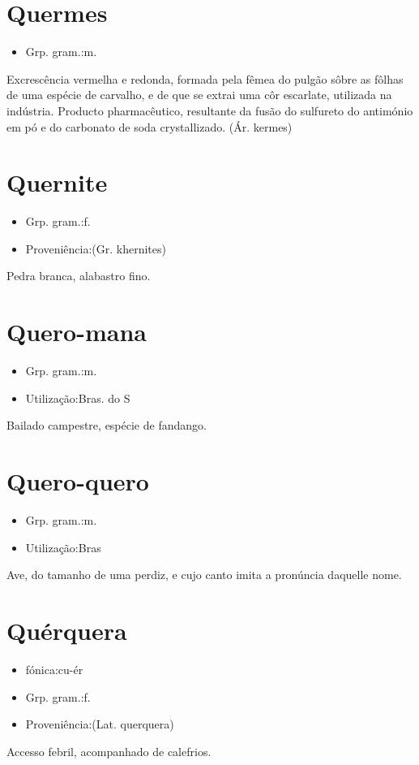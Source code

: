 \section{Quermes}
\begin{itemize}
\item {Grp. gram.:m.}
\end{itemize}
Excrescência vermelha e redonda, formada pela fêmea do pulgão sôbre as fôlhas de uma espécie de carvalho, e de que se extrai uma côr escarlate, utilizada na indústria.
Producto pharmacêutico, resultante da fusão do sulfureto do antimónio em pó e do carbonato de soda crystallizado.
(Ár. \textunderscore kermes\textunderscore )
\section{Quernite}
\begin{itemize}
\item {Grp. gram.:f.}
\end{itemize}
\begin{itemize}
\item {Proveniência:(Gr. \textunderscore khernites\textunderscore )}
\end{itemize}
Pedra branca, alabastro fino.
\section{Quero-mana}
\begin{itemize}
\item {Grp. gram.:m.}
\end{itemize}
\begin{itemize}
\item {Utilização:Bras. do S}
\end{itemize}
Bailado campestre, espécie de fandango.
\section{Quero-quero}
\begin{itemize}
\item {Grp. gram.:m.}
\end{itemize}
\begin{itemize}
\item {Utilização:Bras}
\end{itemize}
Ave, do tamanho de uma perdiz, e cujo canto imita a pronúncia daquelle nome.
\section{Quérquera}
\begin{itemize}
\item {fónica:cu-ér}
\end{itemize}
\begin{itemize}
\item {Grp. gram.:f.}
\end{itemize}
\begin{itemize}
\item {Proveniência:(Lat. \textunderscore querquera\textunderscore )}
\end{itemize}
Accesso febril, acompanhado de calefrios.
